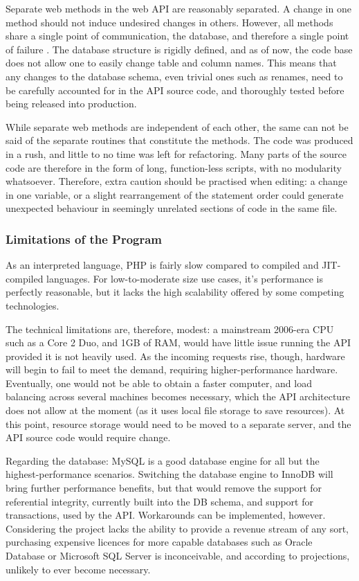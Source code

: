         Separate web methods in the web API are reasonably separated. A change in one method should not induce undesired changes in others. However, all methods share a single point of communication, the database, and therefore a single point of failure . The database structure is rigidly defined, and as of now, the code base does not allow one to easily change table and column names. This means that any changes to the database schema, even trivial ones such as renames, need to be carefully accounted for in the API source code, and thoroughly tested before being released into production.
    
        While separate web methods are independent of each other, the same can not be said of the separate routines that constitute the methods. The code was produced in a rush, and little to no time was left for refactoring. Many parts of the source code are therefore in the form of long, function-less scripts, with no modularity whatsoever. Therefore, extra caution should be practised when editing: a change in one variable, or a slight rearrangement of the statement order could generate unexpected behaviour in seemingly unrelated sections of code in the same file.

    \subsubsection{Limitations of the Program}
        As an interpreted language, PHP is fairly slow compared to compiled and JIT-compiled languages. For low-to-moderate size use cases, it's performance is perfectly reasonable, but it lacks the high scalability offered by some competing technologies. 
    
        The technical limitations are, therefore, modest: a mainstream 2006-era CPU such as a Core 2 Duo, and 1GB of RAM, would have little issue running the API provided it is not heavily used. As the incoming requests rise, though, hardware will begin to fail to meet the demand, requiring higher-performance hardware. Eventually, one would not be able to obtain a faster computer, and load balancing across several machines becomes necessary, which the API architecture does not allow at the moment (as it uses local file storage to save resources). At this point, resource storage would need to be moved to a separate server, and the API source code would require change. 
    
        Regarding the database: MySQL is a good database engine for all but the highest-performance scenarios. Switching the database engine to InnoDB will bring further performance benefits, but that would remove the support for referential integrity, currently built into the DB schema, and support for transactions, used by the API. Workarounds can be implemented, however. Considering the project lacks the ability to provide a revenue stream of any sort, purchasing expensive licences for more capable databases such as Oracle Database or Microsoft SQL Server is inconceivable, and according to projections, unlikely to ever become necessary.

